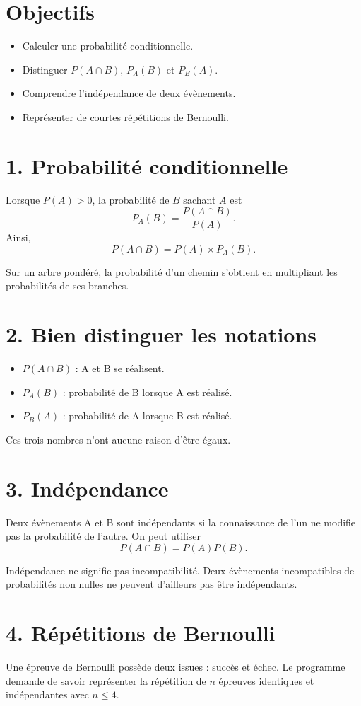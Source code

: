 \section{Objectifs}
\begin{itemize}
\item Calculer une probabilité conditionnelle.
\item Distinguer $P(A\cap B)$, $P_A(B)$ et $P_B(A)$.
\item Comprendre l'indépendance de deux évènements.
\item Représenter de courtes répétitions de Bernoulli.
\end{itemize}

\section{1. Probabilité conditionnelle}
Lorsque $P(A)>0$, la probabilité de $B$ sachant $A$ est
\[
P_A(B)=\frac{P(A\cap B)}{P(A)}.
\]
Ainsi,
\[
P(A\cap B)=P(A)\times P_A(B).
\]

Sur un arbre pondéré, la probabilité d'un chemin s'obtient en multipliant les probabilités de ses branches.

\section{2. Bien distinguer les notations}
\begin{itemize}
\item $P(A\cap B)$ : A et B se réalisent.
\item $P_A(B)$ : probabilité de B lorsque A est réalisé.
\item $P_B(A)$ : probabilité de A lorsque B est réalisé.
\end{itemize}

Ces trois nombres n'ont aucune raison d'être égaux.

\section{3. Indépendance}
Deux évènements A et B sont indépendants si la connaissance de l'un ne modifie pas la probabilité de l'autre. On peut utiliser
\[
P(A\cap B)=P(A)P(B).
\]

Indépendance ne signifie pas incompatibilité. Deux évènements incompatibles de probabilités non nulles ne peuvent d'ailleurs pas être indépendants.

\section{4. Répétitions de Bernoulli}
Une épreuve de Bernoulli possède deux issues : succès et échec. Le programme demande de savoir représenter la répétition de $n$ épreuves identiques et indépendantes avec $n\le4$.


